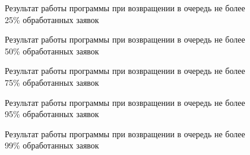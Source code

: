 \documentclass[14pt, a4paper]{extarticle}
\begin{document}
\begin{figure}[H]
\caption{Результат работы программы при возвращении в очередь не более 25\% обработанных заявок}
\label{fig:1_25}
\end{figure}

\begin{figure}[H]
\caption{Результат работы программы при возвращении в очередь не более 50\% обработанных заявок}
\label{fig:1_50}
\end{figure}

\begin{figure}[H]
\caption{Результат работы программы при возвращении в очередь не более 75\% обработанных заявок}
\label{fig:1_75}
\end{figure}

\begin{figure}[H]
\caption{Результат работы программы при возвращении в очередь не более 95\% обработанных заявок}
\label{fig:1_95}
\end{figure}

\begin{figure}[H]
\caption{Результат работы программы при возвращении в очередь не более 99\% обработанных заявок}
\label{fig:1_99}
\end{figure}
\end{document}
